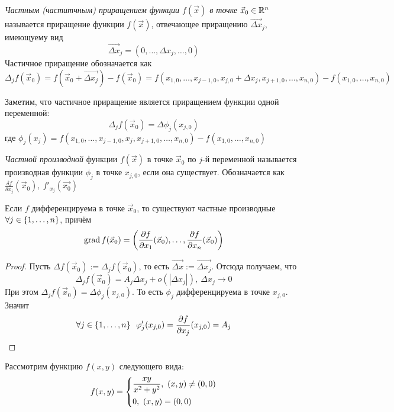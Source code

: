 \begin{definition}
	\textit{Частным (частитчным) приращением функции $f(\vec{x})$ в точке} $\vec{x}_0 \in \mathbb{R}^n$ называется приращение функции $f(\vec{x})$, отвечающее 	приращению $\overrightarrow{\Delta x}_j$, имеющуему вид
	\[
		\overrightarrow{\Delta x}_j = (0, \ldots, \Delta x_j, \ldots, 0)
	\]
	Частичное приращение обозначается как
	\[
		\Delta_j f(\vec{x}_0) = f(\vec{x}_0 + \overrightarrow{\Delta x_j}) - f(\vec{x}_0) = f(x_{1, 0}, \ldots, x_{j - 1, 0}, x_{j, 0} + \Delta x_j, x_{j + 1, 0}, \ldots, x_{n, 0}) - f(x_{1, 0}, \ldots, x_{n, 0})
	\]
\end{definition}

\begin{note}
	Заметим, что частичное приращение является приращением функции одной переменной:
	\[
		\Delta_j f(\vec{x}_0) = \Delta \phi_j (x_{j, 0})
	\]
	где $\phi_j(x_j) = f(x_{1, 0}, \ldots, x_{j - 1, 0}, x_j, x_{j + 1, 0}, \ldots, x_{n, 0}) - f(x_{1, 0}, \ldots, x_{n, 0})$
\end{note}

\begin{definition}
	\textit{Частной производной} функции $f(\vec{x})$ в точке $\vec{x}_0$ по $j$-й переменной называется производная функции $\phi_j$ в точке $x_{j, 0}$, если она существует. Обозначается как $\frac{\delta f}{\delta x_j}(\vec{x}_0),\ f'_{x_j}(\vec{x_0})$
\end{definition}

\begin{theorem}
	Если $f$ дифференцируема в точке $\vec{x}_0$, то существуют частные производные $\forall j \in \{1, \ldots, n\}$, причём
	\[
		\operatorname{grad} f(\vec{x}_0) = \left(\frac{\partial f}{\partial x_1}(\vec{x}_0), \ldots, \frac{\partial f}{\partial x_n}(\vec{x}_0)\right)
	\]
\end{theorem}

\begin{proof}
	Пусть $\Delta f(\vec{x}_0) := \Delta_j f(\vec{x}_0)$, то есть $\overrightarrow{\Delta x} := \overrightarrow{\Delta x_j}$. Отсюда получаем, что
	\[
		\Delta_j f(\vec{x}_0) = A_j \Delta x_j + o(|\Delta x_j|),\ \Delta x_j \to 0
	\]
	При этом $\Delta_j f(\vec{x}_0) = \Delta \phi_j (x_{j, 0})$. То есть $\phi_j$ дифференцируема в точке $x_{j, 0}$. Значит
	\[
		\forall j \in \{1, \ldots, n\}\ \ \varphi'_j (x_{j, 0}) = \frac{\partial f}{\partial x_j} (x_{j, 0}) = A_j
	\]
\end{proof}

\begin{example}
	Рассмотрим функцию $f(x, y)$ следующего вида:
	\[
		f(x, y) = \left\{\begin{aligned}
			&{\frac{xy}{x^2 + y^2},\ (x, y) \neq (0, 0)}
			\\
			&{0,\ (x, y) = (0, 0)}
		\end{aligned}\right.
	\]
\end{example}

